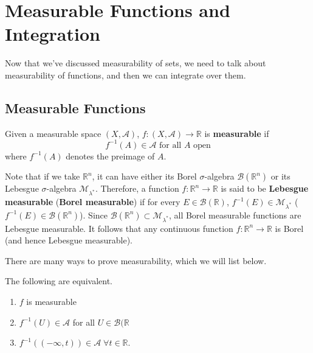 \section{Measurable Functions and Integration}

  Now that we've discussed measurability of sets, we need to talk about measurability of functions, and then we can integrate over them.  

\subsection{Measurable Functions}

  \begin{definition}
    Given a measurable space $(X, \mathcal{A})$, $f: (X, \mathcal{A}) \longrightarrow \mathbb{R}$ is \textbf{measurable} if 
    \begin{equation}
      f^{-1}(A) \in \mathcal{A} \text{ for all } A \text{ open}
    \end{equation}
    where $f^{-1}(A)$ denotes the preimage of $A$. 
  \end{definition}

  Note that if we take $\mathbb{R}^n$, it can have either its Borel $\sigma$-algebra $\mathcal{B}(\mathbb{R}^n)$ or its Lebesgue $\sigma$-algebra $\mathcal{M}_{\lambda^*}$. Therefore, a function $f: \mathbb{R}^n \longrightarrow \mathbb{R}$ is said to be \textbf{Lebesgue measurable} (\textbf{Borel measurable}) if for every $E \in \mathcal{B}(\mathbb{R})$, $f^{-1}(E) \in \mathcal{M}_{\lambda^*}$ ($f^{-1}(E) \in \mathcal{B}(\mathbb{R}^n)$). Since $\mathcal{B}(\mathbb{R}^n) \subset \mathcal{M}_{\lambda^*}$, all Borel measurable functions are Lebesgue measurable. It follows that any continuous function $f: \mathbb{R}^n \longrightarrow \mathbb{R}$ is Borel (and hence Lebesgue measurable). 


  There are many ways to prove measurability, which we will list below. 

  \begin{theorem}[TFAE]
    The following are equivalent. 
    \begin{enumerate}
      \item $f$ is measurable 
      \item $f^{-1} (U) \in \mathcal{A}$ for all $U \in \mathcal{B}(\mathbb{R}$ 
      \item $f^{-1}((-\infty, t)) \in \mathcal{A} \; \forall t \in \mathbb{R}$. 
    \end{enumerate}
  \end{theorem}

